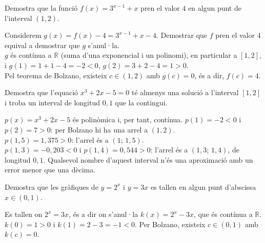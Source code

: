 \begin{apartats}

Demostra que la funció $f(x)=3^{x-1}+x$ pren el valor $4$ en algun punt de l'interval
$(1,2)$.

\begin{solucio}
Considerem $g(x)=f(x)-4=3^{x-1}+x-4$. Demostrar que $f$ pren el valor $4$ equival a
demostrar que $g$ s'anul·la.\\
$g$ és contínua a $\mathbb{R}$ (suma d'una exponencial i un polinomi), en particular a
$[1,2]$, i $g(1)=1+1-4=-2<0$, $g(2)=3+2-4=1>0$.\\
Pel teorema de Bolzano, existeix $c\in(1,2)$ amb $g(c)=0$, és a dir, $f(c)=4$.
\end{solucio}

Demostra que l'equació $x^3+2x-5=0$ té almenys una solució a l'interval $[1,2]$ i troba
un interval de longitud $0{,}1$ que la contingui.

\begin{solucio}
$p(x)=x^3+2x-5$ és polinòmica i, per tant, contínua. $p(1)=-2<0$ i $p(2)=7>0$: per
Bolzano hi ha una arrel a $(1,2)$.\\
$p(1{,}5)=1{,}375>0$: l'arrel és a $(1;\,1{,}5)$.\\
$p(1{,}3)=-0{,}203<0$ i $p(1{,}4)=0{,}544>0$: l'arrel és a $(1{,}3;\,1{,}4)$, de
longitud $0{,}1$. Qualsevol nombre d'aquest interval n'és una aproximació amb un error
menor que una dècima.
\end{solucio}

Demostra que les gràfiques de $y=2^{x}$ i $y=3x$ es tallen en algun punt d'abscissa
$x\in(0,1)$.

\begin{solucio}
Es tallen on $2^x=3x$, és a dir on s'anul·la $k(x)=2^x-3x$, que és contínua a
$\mathbb{R}$. $k(0)=1>0$ i $k(1)=2-3=-1<0$. Per Bolzano, existeix $c\in(0,1)$ amb
$k(c)=0$.
\end{solucio}

\end{apartats}
